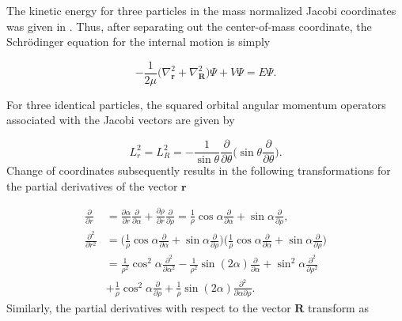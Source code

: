 The kinetic energy for three particles in the mass normalized Jacobi coordinates was given in . Thus, after separating out the center-of-mass coordinate, the Schr{\"o}dinger equation for the internal motion is simply 

\begin{equation}
-\frac{1}{2\mu} \bigg(\nabla^{2}_{\mathbf{r}} + \nabla^{2}_{\mathbf{R}}\bigg) \Psi + V\Psi = E \Psi. 
\end{equation}

For three identical particles, the squared orbital angular momentum operators associated with the Jacobi vectors are given by  

\begin{equation}
L^{2}_r = L^{2}_{R} = -\frac{1}{\sin{\theta}} \frac{\partial}{\partial{\theta}} \bigg( \sin{\theta} \frac{\partial}{\partial{\theta}} \bigg).
\end{equation}
Change of coordinates subsequently results in the following transformations for the partial derivatives of the vector $\mathbf{r}$

\begin{align}
	\frac{\partial}{\partial r}        &= \frac{\partial\alpha}{\partial r} \frac{\partial}{\partial\alpha} +  \frac{\partial\rho}{\partial r} \frac{\partial}{\partial\rho} = \frac{1}{\rho}\cos{\alpha}\frac{\partial}{\partial \alpha} + \sin{\alpha}\frac{\partial}{\partial \rho}, \\
	\frac{\partial^2}{\partial r^2} &= \bigg( \frac{1}{\rho} \cos\alpha \frac{\partial}{\partial\alpha} + \sin\alpha \frac{\partial}{\partial\rho}\bigg) \bigg( \frac{1}{\rho} \cos\alpha \frac{\partial}{\partial\alpha} + \sin\alpha \frac{\partial}{\partial\rho}\bigg) \nonumber \\
	&= \frac{1}{\rho^2} \cos^2\alpha \frac{\partial^2}{\partial\alpha^{2}} - \frac{1}{\rho^2} \sin(2\alpha) \frac{\partial}{\partial\alpha} + \sin^2\alpha \frac{\partial^2}{\partial\rho^{2}} \nonumber \\
	&+ \frac{1}{\rho} \cos^2\alpha \frac{\partial}{\partial\rho} + \frac{1}{\rho} \sin(2\alpha) \frac{\partial^2}{\partial\alpha \partial\rho}.
\end{align}
Similarly, the partial derivatives with respect to the vector $\mathbf{R}$ transform as

